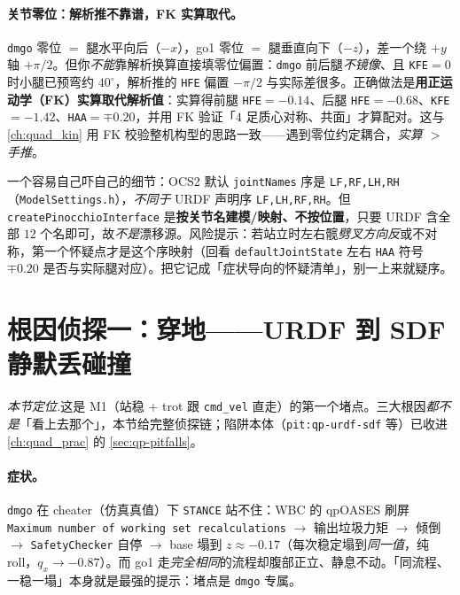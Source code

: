\paragraph{关节零位：解析推不靠谱，FK 实算取代。}
\texttt{dmgo} 零位 $=$ 腿水平向后（$-x$），go1 零位 $=$ 腿垂直向下（$-z$），差一个绕 $+y$ 轴 $+\pi/2$。但你\emph{不能}靠解析换算直接填零位偏置：\texttt{dmgo} 前后腿\emph{不镜像}、且 \texttt{KFE}$=0$ 时小腿已预弯约 $40^\circ$，解析推的 \texttt{HFE} 偏置 $-\pi/2$ 与实际差很多。正确做法是\textbf{用正运动学（FK）实算取代解析值}：实算得前腿 \texttt{HFE}$=-0.14$、后腿 \texttt{HFE}$=-0.68$、\texttt{KFE}$=-1.42$、\texttt{HAA}$=\mp0.20$，并用 FK 验证「$4$ 足质心对称、共面」才算配对。这与 \cref{ch:quad_kin} 用 FK 校验整机构型的思路一致——遇到零位约定耦合，\emph{实算 $>$ 手推}。

\begin{note}\label{note:qadv-jointorder}
一个容易自己吓自己的细节：OCS2 默认 \texttt{jointNames} 序是 \texttt{LF,RF,LH,RH}（\texttt{ModelSettings.h}），\emph{不同于} URDF 声明序 \texttt{LF,LH,RF,RH}。但 \texttt{createPinocchioInterface} 是\textbf{按关节名建模/映射、不按位置}，只要 URDF 含全部 $12$ 个名即可，故\emph{不是}漂移源。风险提示：若站立时左右髋\emph{劈叉方向反}或不对称，第一个怀疑点才是这个序映射（回看 \texttt{defaultJointState} 左右 \texttt{HAA} 符号 $\mp0.20$ 是否与实际腿对应）。把它记成「症状导向的怀疑清单」，别一上来就疑序。
\end{note}

\section{根因侦探一：穿地——URDF 到 SDF 静默丢碰撞}
\label{sec:qadv-rc1}

\noindent\emph{本节定位.}\;这是 M1（站稳 + trot 跟 \texttt{cmd\_vel} 直走）的第一个堵点。三大根因\emph{都不是}「看上去那个」，本节给完整侦探链；陷阱本体（\texttt{pit:qp-urdf-sdf} 等）已收进 \cref{ch:quad_prac} 的 \cref{sec:qp-pitfalls}。

\paragraph{症状。}
\texttt{dmgo} 在 cheater（仿真真值）下 \texttt{STANCE} 站不住：WBC 的 qpOASES 刷屏 \texttt{Maximum number of working set recalculations} $\to$ 输出垃圾力矩 $\to$ 倾倒 $\to$ \texttt{SafetyChecker} 自停 $\to$ base 塌到 $z\approx-0.17$（每次稳定塌到\emph{同一值}，纯 roll，$q_x\to-0.87$）。而 go1 走\emph{完全相同}的流程却腹部正立、静息不动。「同流程、一稳一塌」本身就是最强的提示：堵点是 \texttt{dmgo} 专属。

